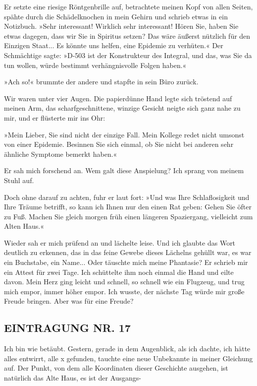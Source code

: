Er setzte eine riesige Röntgenbrille auf, betrachtete meinen Kopf
von allen Seiten, spähte durch die Schädelknochen in mein Gehirn
und schrieb etwas in ein Notizbuch. »Sehr interessant! Wirklich
sehr interessant! Hören Sie, haben Sie etwas dagegen, dass wir Sie
in Spiritus setzen? Das wäre äußerst nützlich für den Einzigen
Staat... Es könnte uns helfen, eine Epidemie zu verhüten.« Der
Schmächtige sagte: »D-503 ist der Konstrukteur des Integral, und
das, was Sie da tun wollen, würde bestimmt verhängnisvolle Folgen
haben.«

»Ach so!« brummte der andere und stapfte in sein Büro zurück.

Wir waren unter vier Augen. Die papierdünne Hand legte sich
tröstend auf meinen Arm, das scharfgeschnittene, winzige Gesicht
neigte sich ganz nahe zu mir, und er flüsterte mir ins Ohr:

»Mein Lieber, Sie sind nicht der einzige Fall. Mein Kollege redet
nicht umsonst von einer Epidemie. Besinnen Sie sich einmal, ob Sie
nicht bei anderen sehr ähnliche Symptome bemerkt haben.«

Er sah mich forschend an. Wem galt diese Anspielung? Ich sprang von
meinem Stuhl auf.

Doch ohne darauf zu achten, fuhr er laut fort: »Und was Ihre
Schlaflosigkeit und Ihre Träume betrifft, so kann ich Ihnen nur den
einen Rat geben: Gehen Sie öfter zu Fuß. Machen Sie gleich morgen
früh einen längeren Spaziergang, vielleicht zum Alten Haus.«

Wieder sah er mich prüfend an und lächelte leise. Und ich glaubte
das Wort deutlich zu erkennen, das in das feine Gewebe dieses
Lächelns gehüllt war, es war ein Buchstabe, ein Name... Oder
täuschte mich meine Phantasie? Er schrieb mir ein Attest für zwei
Tage. Ich schüttelte ihm noch einmal die Hand und eilte davon. Mein
Herz ging leicht und schnell, so schnell wie ein Flugzeug, und trug
mich empor, immer höher empor. Ich wusste, der nächste Tag würde
mir große Freude bringen. Aber was für eine Freude?

\subsection{EINTRAGUNG NR. 17}

Ich bin wie betäubt. Gestern, gerade in dem Augenblick, als ich
dachte, ich hätte alles entwirrt, alle x gefunden, tauchte eine
neue Unbekannte in meiner Gleichung auf. Der Punkt, von dem alle
Koordinaten dieser Geschichte ausgehen, ist natürlich das Alte
Haus, es ist der Ausgangs-

